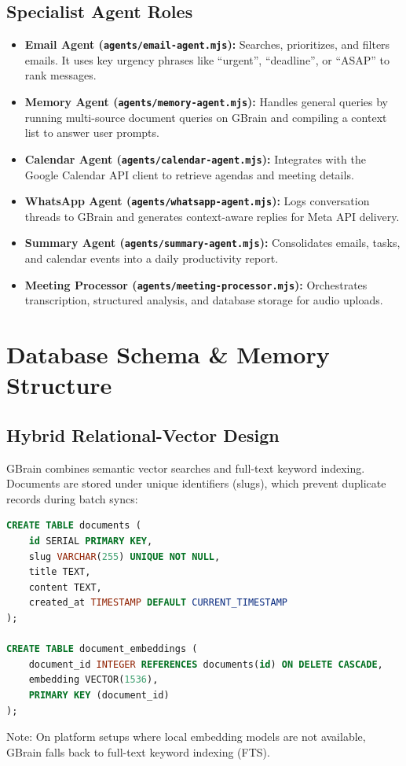 \documentclass[12pt,a4paper]{report}
\begin{document}
\section{Specialist Agent Roles}
\begin{itemize}
    \item \textbf{Email Agent (\texttt{agents/email-agent.mjs}):} Searches, prioritizes, and filters emails. It uses key urgency phrases like ``urgent'', ``deadline'', or ``ASAP'' to rank messages.
    \item \textbf{Memory Agent (\texttt{agents/memory-agent.mjs}):} Handles general queries by running multi-source document queries on GBrain and compiling a context list to answer user prompts.
    \item \textbf{Calendar Agent (\texttt{agents/calendar-agent.mjs}):} Integrates with the Google Calendar API client to retrieve agendas and meeting details.
    \item \textbf{WhatsApp Agent (\texttt{agents/whatsapp-agent.mjs}):} Logs conversation threads to GBrain and generates context-aware replies for Meta API delivery.
    \item \textbf{Summary Agent (\texttt{agents/summary-agent.mjs}):} Consolidates emails, tasks, and calendar events into a daily productivity report.
    \item \textbf{Meeting Processor (\texttt{agents/meeting-processor.mjs}):} Orchestrates transcription, structured analysis, and database storage for audio uploads.
\end{itemize}

\chapter{Database Schema \& Memory Structure}
\label{chap:database}

\section{Hybrid Relational-Vector Design}
GBrain combines semantic vector searches and full-text keyword indexing. 
Documents are stored under unique identifiers (slugs), which prevent duplicate records during batch syncs:
\begin{lstlisting}[language=SQL, caption=Logical representation of GBrain internal tables]
CREATE TABLE documents (
    id SERIAL PRIMARY KEY,
    slug VARCHAR(255) UNIQUE NOT NULL,
    title TEXT,
    content TEXT,
    created_at TIMESTAMP DEFAULT CURRENT_TIMESTAMP
);

CREATE TABLE document_embeddings (
    document_id INTEGER REFERENCES documents(id) ON DELETE CASCADE,
    embedding VECTOR(1536),
    PRIMARY KEY (document_id)
);
\end{lstlisting}
\textsf{Note: On platform setups where local embedding models are not available, GBrain falls back to full-text keyword indexing (FTS).}
\end{document}
